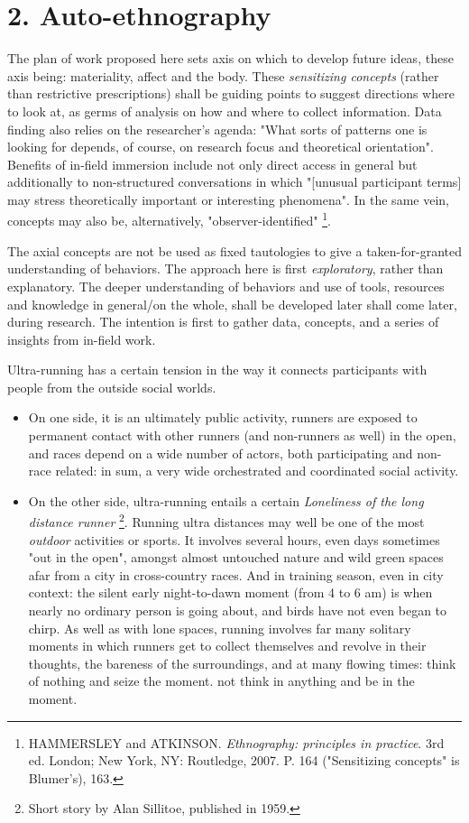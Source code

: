 \clearpage
\section*{2. Auto-ethnography}

The plan of work proposed here sets axis on which to develop future ideas, these axis being: materiality, affect and the body. These \textit{sensitizing concepts} (rather than restrictive prescriptions) shall be guiding points to suggest directions where to look at, as germs of analysis on how and where to collect information. Data finding also relies on the researcher's agenda: "What sorts of patterns one is looking for depends, of course, on research focus and theoretical orientation". Benefits of in-field immersion include not only direct access in general but additionally to non-structured conversations in which "[unusual participant terms] may stress theoretically important or interesting phenomena". In the same vein, concepts may also be, alternatively, "observer-identified"%
\footnote{HAMMERSLEY and ATKINSON. \textit{Ethnography: principles in practice}. 3rd ed. London; New York, NY: Routledge, 2007. P. 164 ("Sensitizing concepts" is Blumer's), 163.}.

The axial concepts are not be used as fixed tautologies to give a taken-for-granted understanding of behaviors. The approach here is first \textit{exploratory}, rather  than explanatory. The deeper understanding of behaviors and use of tools, resources and knowledge in general/on the whole, shall be developed later shall come later, during research. The intention is first to gather data, concepts, and a series of insights from in-field work.

Ultra-running has a certain tension in the way it connects participants with people from the outside social worlds.

\begin{itemize}
 \item On one side, it is an ultimately public activity, runners are exposed to permanent contact with other runners (and non-runners as well) in the open, and races depend on a wide number  of actors, both participating and non-race related: in sum, a very wide orchestrated and coordinated social activity.
 \item On the other side, ultra-running entails a certain \textit{Loneliness of the long distance runner}%
 \footnote{Short story by Alan Sillitoe, published in 1959.}. 
 Running ultra distances may well be one of  the most \textit{outdoor} activities or sports. It involves several hours, even days sometimes "out in the  open", amongst  almost untouched nature and wild green spaces afar from a city in cross-country races. And in training season, even in city context: the silent early night-to-dawn moment (from 4 to 6 am) is when nearly no ordinary person is going about, and birds have not even began to chirp. As well as with lone spaces, running involves far many solitary moments in which runners get to collect themselves and revolve in their thoughts, the bareness of the surroundings, and at many flowing times:  think of nothing and  seize the moment.  not think in anything and be in the moment.
\end{itemize}


